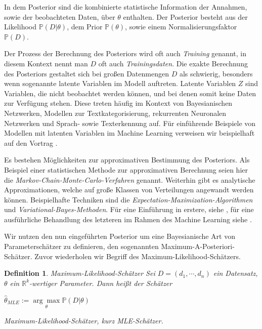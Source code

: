 \documentclass{report}
\theoremstyle{linebreak}
\newtheorem{defi}{Definition}%
\begin{document}
In dem Posterior sind die kombinierte statistische Information der Annahmen, sowie der beobachteten Daten, über $\theta$ enthalten. Der Posterior besteht aus der Likelihood $\mathbb{P}(D\vert \theta)$, dem Prior $\mathbb{P}(\theta)$, sowie einem Normalisierungsfaktor $\mathbb{P}(D)$. 

Der Prozess der Berechnung des Posteriors wird oft auch \textit{Training} genannt, in diesem Kontext nennt man $D$ oft auch \textit{Trainingsdaten}. Die exakte Berechnung des Posteriors gestaltet sich bei großen Datenmengen $D$ als schwierig, besonders wenn sogenannte latente Variablen im Modell auftreten. Latente Variablen $Z$ sind Variablen, die nicht beobachtet werden können, und bei denen somit keine Daten zur Verfügung stehen. Diese treten häufig im Kontext von Bayesianischen Netzwerken, Modellen zur Textkategorisierung, rekurrenten Neuronalen Netzwerken und Sprach- sowie Texterkennung auf. Für einführende Beispiele von Modellen mit latenten Variablen im Machine Learning verweisen wir beispielhaft auf den Vortrag \cite{Latent_Variables}. 

Es bestehen Möglichkeiten zur approximativen Bestimmung des Posteriors. Als Beispiel einer statistischen Methode zur approximativen Berechnung seien hier die \textit{Markov-Chain-Monte-Carlo-Verfahren} genannt. Weiterhin gibt es analytische Approximationen, welche auf große Klassen von Verteilungen angewandt werden können. Beispielhafte Techniken sind die \textit{Expectation-Maximization-Algorithmen} und \textit{Variational-Bayes-Methoden}. Für eine Einführung in erstere, siehe \cite{Exp_Max}, für eine ausführliche Behandlung des letzteren im Rahmen des Machine Learning siehe \cite{Var_Bayes}. 




Wir nutzen den nun eingeführten Posterior um eine Bayesianische Art von Parameterschätzer zu definieren, den sogenannten Maximum-A-Posteriori-Schätzer. Zuvor wiederholen wir Begriff des Maximum-Likelihood-Schätzers.

\begin{defi}{Maximum-Likelihood-Schätzer}
	Sei $D = (d_1, \cdots, d_n)$ ein Datensatz, $\theta$ ein $\mathbb{R}^k$-wertiger 
	Parameter. Dann heißt der Schätzer
	\begin{center}
		$\hat{\theta}_{MLE} := \underset{\theta}{\arg \max} \mathbb{P}(D \vert \theta)$
	\end{center}
	\textit{Maximum-Likelihood-Schätzer}, kurz \textit{MLE-Schätzer}.
\end{defi}
\end{document}
